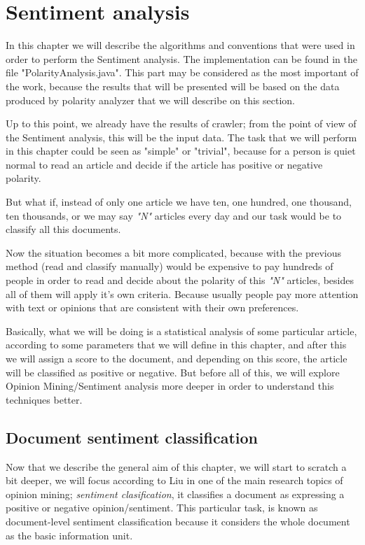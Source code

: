 \section{Sentiment analysis}\label{sentimentAnalysis}

In this chapter we will describe the algorithms and conventions that were used in order to perform the Sentiment analysis. The implementation can be found in the file "PolarityAnalysis.java".
This part may be considered as the most important of the work, because the results that will be presented will be based on the data produced by polarity analyzer that we will describe on this section.

Up to this point, we already have the results of crawler; from the point of view of the Sentiment analysis, this will be the input data. The task that we will perform in this chapter could be seen as "simple" or "trivial", because for a person is quiet normal to read an article and decide if the article has positive or negative polarity.

But what if, instead of only one article we have ten, one hundred, one thousand, ten thousands, or we may say \textit{"N"} articles every day and our task would be to classify all this documents.

Now the situation becomes a bit more complicated, because with the previous method (read and classify manually) would be expensive to pay hundreds of people in order to read and decide about the polarity of this \textit{"N"} articles, besides all of them will apply it's own criteria. \cite[p. 459]{L2011} Because usually people pay more attention with text or opinions that are consistent with their own preferences.

Basically, what we will be doing is a statistical analysis of some particular article, according to some parameters that we will define in this chapter, and after this we will assign a score to the document, and depending on this score, the article will be classified as positive or negative. But before all of this, we will explore Opinion Mining/Sentiment analysis more deeper in order to understand this techniques better. 

\subsection{Document sentiment classification}\label{documentSentimentClasification}

Now that we describe the general aim of this chapter, we will start to scratch a bit deeper, we will focus according to Liu \cite[p. 469]{L2011} in one of the main research topics of opinion mining; \textit{sentiment clasification}, it classifies a document as expressing a positive or negative opinion/sentiment. This particular task, is known as document-level sentiment classification because it considers the whole document as the basic information unit. 

